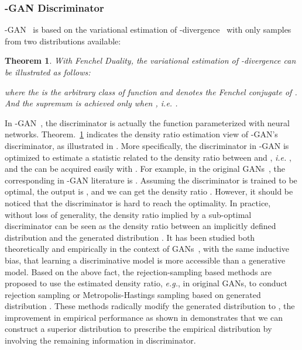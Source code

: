 \documentclass{article}
\newtheorem{theorem}{Theorem}
\begin{document}
\subsubsection{-GAN Discriminator}
\label{f-GAN-d}
-GAN~\cite{nguyen2010estimating} is based on the variational estimation of -divergence~\cite{ali1966general} with only samples from two distributions available:
\begin{theorem}\cite{nguyen2010estimating}
\label{fgan}
With Fenchel Duality, the variational estimation of -divergence can be illustrated as follows:

where the  is the arbitrary class of function and  denotes the Fenchel conjugate of . And the supremum is achieved only when , \emph{i.e.} .
\end{theorem}
In -GAN~\cite{nowozin2016f}, the discriminator  is actually the function  parameterized with neural networks. Theorem.~\ref{fgan} indicates the density ratio estimation view of -GAN's discriminator, as illustrated in \cite{uehara2016generative}. More specifically, the discriminator in -GAN is  optimized to estimate a statistic related to the density ratio between  and , \emph{i.e.} , and the   can be acquired easily with . For example, in the original GANs~\cite{goodfellow2014generative}, the corresponding  in -GAN literature is . Assuming the discriminator is trained to be optimal, the output is , and we can get the density ratio . However, it should be noticed that the discriminator is hard to reach the optimality. In practice, without loss of generality, the density ratio implied by a sub-optimal discriminator can be seen as the density ratio between an  implicitly defined distribution  and the generated distribution . It has been studied both theoretically and empirically in the context of GANs~\cite{arjovsky2017wasserstein,heusel2017gans,hjelm2017boundary}, with the same inductive bias, that learning a discriminative model is more accessible than a generative model. Based on the above fact, the rejection-sampling based methods are proposed to use the estimated density ratio, \emph{e.g.},  in original GANs, to conduct rejection sampling\cite{azadi2018discriminator} or Metropolis-Hastings sampling\cite{turner2018metropolis} based on generated distribution . These methods radically modify the generated distribution  to , the improvement in empirical performance as shown in \cite{azadi2018discriminator,turner2018metropolis} demonstrates that we can construct a superior distribution    to prescribe the empirical distribution  by involving the remaining information in discriminator. 
\end{document}
